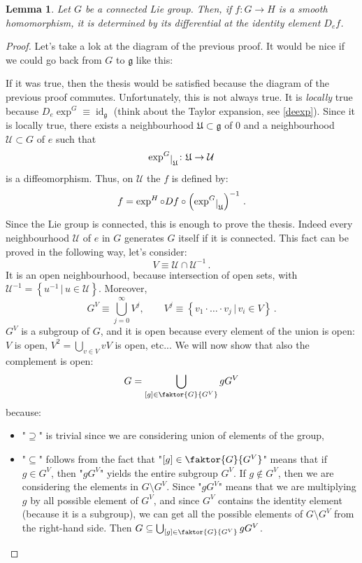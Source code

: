 \documentclass[a4paper,11pt,titlepage, article, oneside]{memoir}
\numberwithin{equation}{section}
\newtheorem{lemma}[theorem]{Lemma}
\theoremstyle{definition}
\theoremstyle{remark}
\DeclareMathOperator{\id}{id}
\newcommand{\lie}[1]{\mathfrak{#1}}
\newcommand{\restrict}[2]{{#1}\raisebox{-.5ex}{$|$}_{#2}}
\begin{document}
\begin{lemma} \label{connliegroup}
Let $G$ be a connected Lie group. Then, if $f \colon G \rightarrow H$ is a smooth homomorphism, it is determined by its differential at the identity element $D_e f$.
\end{lemma}
\begin{proof}
Let's take a lok at the diagram of the previous proof. It would be nice if we could go back from $G$ to $\lie{g}$ like this: 
\begin{center}
\end{center}
If it was true, then the thesis would be satisfied because the diagram of the previous proof commutes. Unfortunately, this is not always true. It is \textit{locally} true because $D_e \exp^G \equiv \id_{\lie{g}}$ (think about the Taylor expansion, see \eqref{deexp}). Since it is locally true, there exists a neighbourhood $\mathfrak{U} \subset \lie{g}$ of 0 and a neighbourhood $\mathcal{U} \subset G$ of $e$ such that 
$$\restrict{\exp^G}{\mathfrak{U}} \colon \mathfrak{U} \rightarrow \mathcal{U}$$
is a diffeomorphism. Thus, on $\mathcal{U}$ the $f$ is defined by:
$$f = \exp^H \circ Df \circ \left(\restrict{\exp^G}{\mathfrak{U}}\right)^{-1} \, .$$
Since the Lie group is connected, this is enough to prove the thesis. Indeed every neighbourhood $\mathcal{U}$ of $e$ in $G$ generates $G$ itself if it is connected. This fact can be proved in the following way, let's consider:
$$V \equiv \mathcal{U} \cap \mathcal{U}^{-1} \, .$$
It is an open neighbourhood, because intersection of open sets, with 
$\mathcal{U}^{-1} = \left \{u^{-1} \, | \, u \in \mathcal{U} \right \}$. Moreover,
$$G^V \equiv \bigcup_{j=0}^{\infty} V^j, \qquad V^j \equiv \left \{v_1 \cdot \ldots \cdot v_j \, | \, v_i \in V \right \} \, .$$
$G^V$ is a subgroup of $G$, and it is open because every element of the union is open: $V$ is open, $V^2 = \bigcup_{v \in V} v V$ is open, etc... We will now show that also the complement is open:
$$G = \bigcup_{[g] \in \faktor{G}{G^V}} g G^V$$ 
because: 
\begin{itemize}
\item "$\supseteq$" is trivial since we are considering union of elements of the group,
\item "$\subseteq$" follows from the fact that "$[g] \in \faktor{G}{G^V}$" means that if $g \in G^V$, then "$gG^V$" yields the entire subgroup $G^V$. If $g \not \in G^V$, then we are considering the elements in $G \setminus G^V$. Since "$g G^V$" means that we are multiplying $g$ by all possible element of $G^V$, and since $G^V$ contains the identity element (because it is a subgroup), we can get all the possible elements of $G \setminus G^V$ from the right-hand side. Then $G \subseteq \bigcup_{[g] \in \faktor{G}{G^V}} g G^V$.

\end{itemize}
\end{proof}
\end{document}
